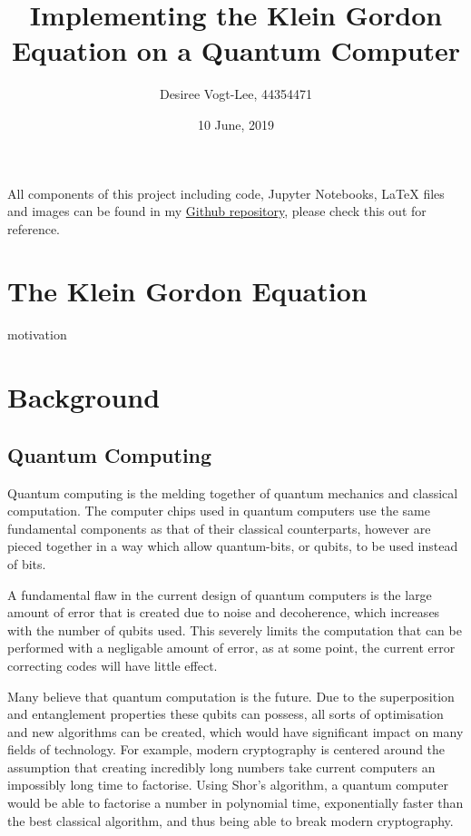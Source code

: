 \documentclass{article}
\title{Implementing the Klein Gordon Equation on a Quantum Computer}
\author{Desiree Vogt-Lee, 44354471}
\date{10 June, 2019}
\begin{document}
	\maketitle
	\begin{center}
	    All components of this project including code, Jupyter Notebooks, LaTeX files and images can be found in my \href{https://github.com/desireevl/PHYS3051}{Github repository}, please check this out for reference.
	\end{center}


\section{The Klein Gordon Equation}

motivation 

\section{Background}
\subsection{Quantum Computing}
Quantum computing is the melding together of quantum mechanics and classical computation. The computer chips used in quantum computers use the same fundamental components as that of their classical counterparts, however are pieced together in a way which allow quantum-bits, or qubits, to be used instead of bits. 

A fundamental flaw in the current design of quantum computers is the large amount of error that is created due to noise and decoherence, which increases with the number of qubits used. This severely limits the computation that can be performed with a negligable amount of error, as at some point, the current error correcting codes will have little effect. 

Many believe that quantum computation is the future. Due to the superposition and entanglement properties these qubits can possess, all sorts of optimisation and new algorithms can be created, which would have significant impact on many fields of technology. For example, modern cryptography is centered around the assumption that creating incredibly long numbers take current computers an impossibly long time to factorise. Using Shor's algorithm, a quantum computer would be able to factorise a number in polynomial time, exponentially faster than the best classical algorithm, and thus being able to break modern cryptography. \cite{minutephysics}
\end{document}
